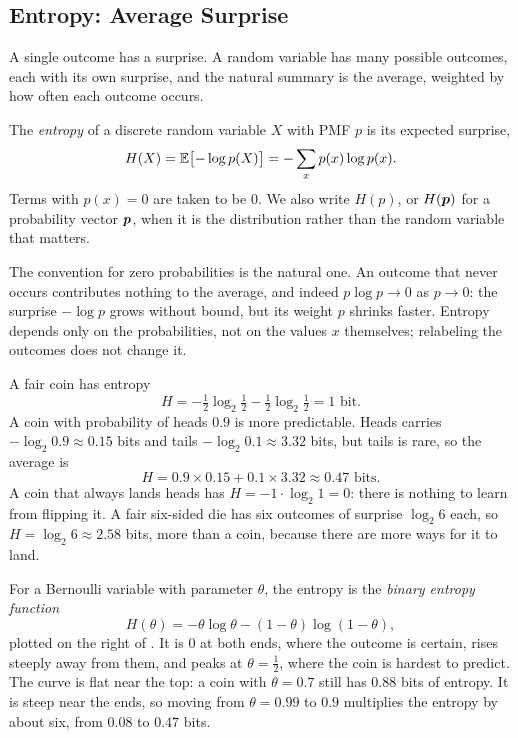 \subsection{Entropy: Average Surprise}
\label{sec:ch07-entropy-def}

A single outcome has a surprise. A random variable has many possible
outcomes, each with its own surprise, and the natural summary is the
average, weighted by how often each outcome occurs.

\begin{definition}[Entropy]
  \label{def:entropy}
  The \emph{entropy} of a discrete random variable $X$ with PMF $p$ is
  its expected surprise,
  \[
    H(X) = \mathbb{E}\bigl[-\log p(X)\bigr] = -\sum_{x} p(x) \log p(x) .
  \]
  Terms with $p(x) = 0$ are taken to be $0$. We also write $H(p)$, or
  $H(\bm{p})$ for a probability vector $\bm{p}$, when it is the
  distribution rather than the random variable that matters.
\end{definition}

The convention for zero probabilities is the natural one. An outcome
that never occurs contributes nothing to the average, and indeed $p \log
p \to 0$ as $p \to 0$: the surprise $-\log p$ grows without bound, but
its weight $p$ shrinks faster. Entropy depends only on the probabilities,
not on the values $x$ themselves; relabeling the outcomes does not change
it.

\begin{example}
  \label{ex:ch07-coins}
  A fair coin has entropy
  \[
    H = -\tfrac12 \log_2 \tfrac12 - \tfrac12 \log_2 \tfrac12 = 1 \text{ bit}.
  \]
  A coin with probability of heads $0.9$ is more predictable. Heads carries
  $-\log_2 0.9 \approx 0.15$ bits and tails $-\log_2 0.1 \approx 3.32$
  bits, but tails is rare, so the average is
  \[
    H = 0.9 \times 0.15 + 0.1 \times 3.32 \approx 0.47 \text{ bits}.
  \]
  A coin that always lands heads has $H = -1 \cdot \log_2 1 = 0$: there
  is nothing to learn from flipping it. A fair six-sided die has six
  outcomes of surprise $\log_2 6$ each, so $H = \log_2 6 \approx 2.58$
  bits, more than a coin, because there are more ways for it to land.
\end{example}

For a Bernoulli variable with parameter $\theta$, the entropy is the
\emph{binary entropy function}
\[
  H(\theta) = -\theta \log \theta - (1 - \theta) \log (1 - \theta),
\]
plotted on the right of . It is $0$ at both ends,
where the outcome is certain, rises steeply away from them, and peaks at
$\theta = \tfrac12$, where the coin is hardest to predict. The curve is
flat near the top: a coin with $\theta = 0.7$ still has $0.88$ bits of
entropy. It is steep near the ends, so moving from $\theta = 0.99$ to
$0.9$ multiplies the entropy by about six, from $0.08$ to $0.47$ bits.

